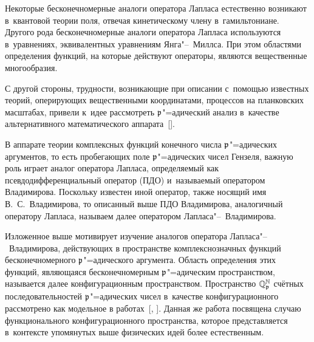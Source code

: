 

 \date{25/XII/2010} %



 \maketitle

 Некоторые бесконечномерные аналоги оператора Лапласа  естественно возникают в~квантовой теории поля, отвечая кинетическому члену в~гамильтониане.
Другого рода бесконечномерные аналоги оператора Лапласа  используются в~уравнениях, эквивалентных уравнениям Янга"--~Миллса.
При этом областями определения функций, на которые действуют операторы, являются вещественные многообразия.

С другой стороны, трудности, возникающие при описании с~помощью  известных теорий, оперирующих  вещественными координатами,
процессов  на планковских масштабах,  привели к~идее рассмотреть ${\mathfrak p}$"=адический анализ  в~качестве альтернативного математического аппарата~[].

В аппарате теории комплексных функций конечного числа ${\mathfrak p}$"=адических аргументов, то есть пробегающих поле ${\mathfrak p}$"=адических чисел Гензеля,
важную роль играет аналог оператора Лапласа,  определяемый как псевдодифференциальный оператор (ПДО)  и~называемый оператором Владимирова. 
Поскольку известен иной оператор, также носящий имя  В.~С.~Владимирова, то описанный выше ПДО Владимирова,  аналогичный оператору Лапласа, называем далее
 оператором Лапласа"--~Владимирова.


Изложенное выше мотивирует изучение аналогов оператора Лапласа"--~Владимирова,  действующих в пространстве комплекснозначных функций  бесконечномерного ${\mathfrak p}$"=адического аргумента.
Область определения этих функций, являющаяся бесконечномерным  ${\mathfrak p}$"=адическим пространством, называется далее конфигурационным  пространством. 
Пространство $\mathbb Q_{\mathfrak p}^{\mathbb N}$ счётных последовательностей ${\mathfrak p}$"=адических чисел в~качестве  конфигурационного рассмотрено как модельное в работах~[, ].
Данная же работа посвящена случаю функционального конфигурационного пространства,  которое представляется в~контексте упомянутых выше физических идей более естественным.

